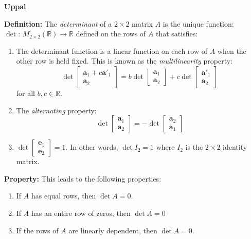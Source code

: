 \documentclass{article}
\newcommand{\bff}[1]{\mathbf{#1}}
\begin{document}
    \begin{minipage}[t]{.45\linewidth}
        \begin{center}
            \textbf{Uppal}
        \end{center}
        \textbf{Definition:} The \textit{determinant} of a $2\times 2$ matrix $A$ is the unique function: $\det:\, M_{2\times 2}(\mathbb{R}) \to \mathbb{R}$ defined on the rows of $A$ that satisfies:
        \vspace{1mm}
        \begin{enumerate}[label=(\alph*)]
            \item The determinant function is a linear function on each row of $A$ when the other row is held fixed. This is known as the \textit{multilinearity} property:
            $$\det\begin{bmatrix}
                \bff{a}_1+c\bff{a'}_1 \\ \bff{a}_2
            \end{bmatrix} = b \det\begin{bmatrix}
                \bff{a}_1 \\ \bff{a}_2
            \end{bmatrix} + c \det\begin{bmatrix}
                \bff{a'}_1 \\ \bff{a}_2
            \end{bmatrix} $$
            for all $b,c \in \mathbb{R}$.
            \item The \textit{alternating} property: $$\det \begin{bmatrix}
                \bff{a}_1 \\ \bff{a}_2
            \end{bmatrix} = - \det\begin{bmatrix}
                \bff{a}_2 \\ \bff{a}_1
            \end{bmatrix}$$
            \item $\det \begin{bmatrix}
                \bff{e}_1 \\ \bff{e}_2
            \end{bmatrix} = 1$. In other words, $\det I_2=1$ where $I_2$ is the $2\times 2 $ identity matrix.
        \end{enumerate}
        \vspace{2mm}
        
        \textbf{Property:} This leads to the following properties:
        \begin{enumerate}[label=(\alph*)]
            \item If $A$ has equal rows, then $\det A = 0$.
            \item If $A$ has an entire row of zeros, then $\det A = 0$
            \item If the rows of $A$ are linearly dependent, then $\det A = 0$.
        \end{enumerate}
        \vspace{2mm}


\end{minipage}
\end{document}
